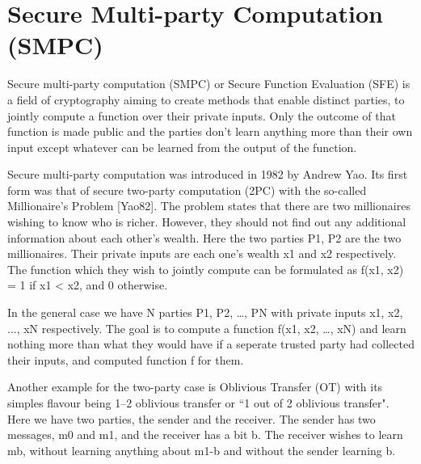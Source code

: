 \section{Secure Multi-party Computation (SMPC)}
Secure multi-party computation (SMPC) or Secure Function Evaluation (SFE) is a field of cryptography aiming to create methods that enable distinct parties, to jointly compute a function over their private inputs.
Only the outcome of that function is made public and the parties don’t learn anything more than their own input except whatever can be learned from the output of the function.

Secure multi-party computation was introduced in 1982 by Andrew Yao.
Its first form was that of secure two-party computation (2PC) with the so-called Millionaire's Problem [Yao82].
The problem states that there are two millionaires wishing to know who is richer.
However, they should not find out any additional information about each other’s wealth.
Here the two parties P1, P2 are the two millionaires.
Their private inputs are each one’s wealth x1 and x2 respectively.
The function which they wish to jointly compute can be formulated as f(x1, x2) = 1 if x1 < x2, and 0 otherwise.

In the general case we have N parties P1, P2, …, PN with private inputs x1, x2, ..., xN respectively.
The goal is to compute a function f(x1, x2, …, xN) and learn nothing more than what they would have if a seperate trusted party had collected their inputs, and computed function f for them.

Another example for the two-party case is Oblivious Transfer (OT) with its simples flavour being 1–2 oblivious transfer or ``1 out of 2 oblivious transfer".
Here we have two parties, the sender and the receiver.
The sender has two messages, m0 and m1, and the receiver has a bit b. The receiver wishes to learn mb, without learning anything about m1-b and without the sender learning b.